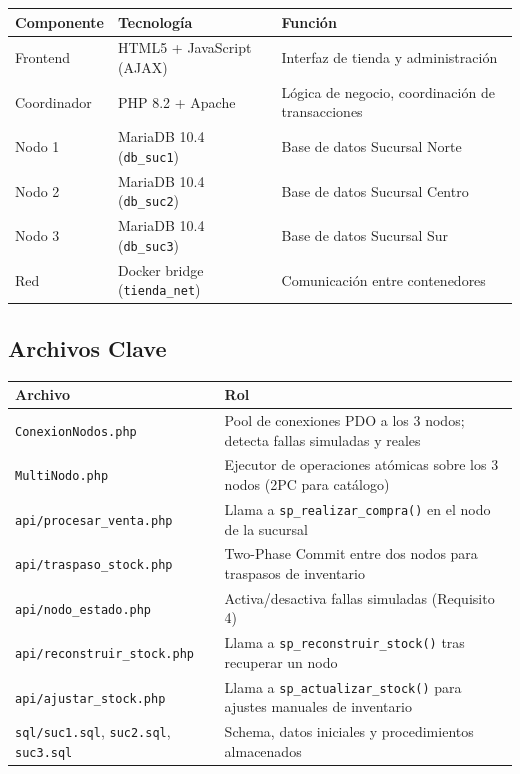 \documentclass[11pt,a4paper]{article}
\newcommand{\code}[1]{\texttt{#1}}
\begin{document}
\begin{table}[h]
\centering
\begin{tabularx}{\textwidth}{@{}l l X@{}}
\toprule
\textbf{Componente} & \textbf{Tecnología} & \textbf{Función} \\
\midrule
Frontend & HTML5 + JavaScript (AJAX) & Interfaz de tienda y administración \\
Coordinador & PHP 8.2 + Apache & Lógica de negocio, coordinación de transacciones \\
Nodo 1 & MariaDB 10.4 (\code{db\_suc1}) & Base de datos Sucursal Norte \\
Nodo 2 & MariaDB 10.4 (\code{db\_suc2}) & Base de datos Sucursal Centro \\
Nodo 3 & MariaDB 10.4 (\code{db\_suc3}) & Base de datos Sucursal Sur \\
Red & Docker bridge (\code{tienda\_net}) & Comunicación entre contenedores \\
\bottomrule
\end{tabularx}
\end{table}

\subsection{Archivos Clave}

\begin{table}[h]
\centering
\begin{tabularx}{\textwidth}{@{}l X@{}}
\toprule
\textbf{Archivo} & \textbf{Rol} \\
\midrule
\code{ConexionNodos.php} & Pool de conexiones PDO a los 3 nodos; detecta fallas simuladas y reales \\
\code{MultiNodo.php} & Ejecutor de operaciones atómicas sobre los 3 nodos (2PC para catálogo) \\
\code{api/procesar\_venta.php} & Llama a \code{sp\_realizar\_compra()} en el nodo de la sucursal \\
\code{api/traspaso\_stock.php} & Two-Phase Commit entre dos nodos para traspasos de inventario \\
\code{api/nodo\_estado.php} & Activa/desactiva fallas simuladas (Requisito 4) \\
\code{api/reconstruir\_stock.php} & Llama a \code{sp\_reconstruir\_stock()} tras recuperar un nodo \\
\code{api/ajustar\_stock.php} & Llama a \code{sp\_actualizar\_stock()} para ajustes manuales de inventario \\
\code{sql/suc1.sql}, \code{suc2.sql}, \code{suc3.sql} & Schema, datos iniciales y procedimientos almacenados \\
\bottomrule
\end{tabularx}
\end{table}
\end{document}
